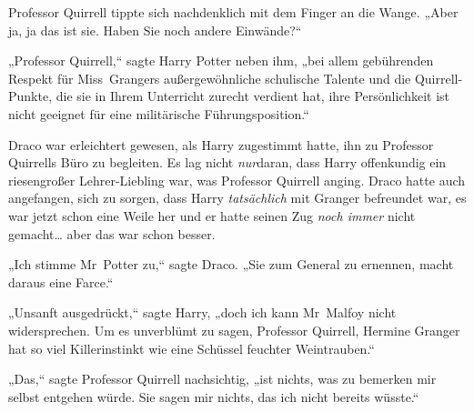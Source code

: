 Professor Quirrell tippte sich nachdenklich mit dem Finger an die Wange. „Aber ja, ja das ist sie. Haben Sie noch andere Einwände?“

„Professor Quirrell,“ sagte Harry Potter neben ihm, „bei allem gebührenden Respekt für Miss~Grangers außergewöhnliche schulische Talente und die Quirrell-Punkte, die sie in Ihrem Unterricht zurecht verdient hat, ihre Persönlichkeit ist nicht geeignet für eine militärische Führungsposition.“

Draco war erleichtert gewesen, als Harry zugestimmt hatte, ihn zu Professor Quirrells Büro zu begleiten. Es lag nicht \emph{nur}daran, dass Harry offenkundig ein riesengroßer Lehrer-Liebling war, was Professor Quirrell anging. Draco hatte auch angefangen, sich zu sorgen, dass Harry \emph{tatsächlich} mit Granger befreundet war, es war jetzt schon eine Weile her und er hatte seinen Zug \emph{noch immer} nicht gemacht… aber das war schon besser.

„Ich stimme Mr~Potter zu,“ sagte Draco. „Sie zum General zu ernennen, macht daraus eine Farce.“

„Unsanft ausgedrückt,“ sagte Harry, „doch ich kann Mr~Malfoy nicht widersprechen. Um es unverblümt zu sagen, Professor Quirrell, Hermine Granger hat so viel Killerinstinkt wie eine Schüssel feuchter Weintrauben.“

„Das,“ sagte Professor Quirrell nachsichtig, „ist nichts, was zu bemerken mir selbst entgehen würde. Sie sagen mir nichts, das ich nicht bereits wüsste.“

